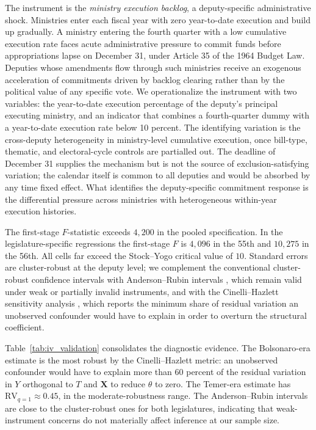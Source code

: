 \documentclass[preprint,12pt,authoryear]{elsarticle}
\begin{document}
The instrument is the \emph{ministry execution backlog}, a deputy-specific administrative shock. Ministries enter each fiscal year with zero year-to-date execution and build up gradually. A ministry entering the fourth quarter with a low cumulative execution rate faces acute administrative pressure to commit funds before appropriations lapse on December 31, under Article 35 of the 1964 Budget Law. Deputies whose amendments flow through such ministries receive an exogenous acceleration of commitments driven by backlog clearing rather than by the political value of any specific vote. We operationalize the instrument with two variables: the year-to-date execution percentage of the deputy's principal executing ministry, and an indicator that combines a fourth-quarter dummy with a year-to-date execution rate below 10 percent. The identifying variation is the cross-deputy heterogeneity in ministry-level cumulative execution, once bill-type, thematic, and electoral-cycle controls are partialled out. The deadline of December 31 supplies the mechanism but is not the source of exclusion-satisfying variation; the calendar itself is common to all deputies and would be absorbed by any time fixed effect. What identifies the deputy-specific commitment response is the differential pressure across ministries with heterogeneous within-year execution histories.

The first-stage $F$-statistic exceeds $4{,}200$ in the pooled specification. In the legislature-specific regressions the first-stage $F$ is $4{,}096$ in the 55th and $10{,}275$ in the 56th. All cells far exceed the Stock--Yogo critical value of $10$. Standard errors are cluster-robust at the deputy level; we complement the conventional cluster-robust confidence intervals with Anderson--Rubin intervals \citep{AndersonRubin1949}, which remain valid under weak or partially invalid instruments, and with the Cinelli--Hazlett sensitivity analysis \citep{CinelliHazlett2020}, which reports the minimum share of residual variation an unobserved confounder would have to explain in order to overturn the structural coefficient.

Table~\ref{tab:iv_validation} consolidates the diagnostic evidence. The Bolsonaro-era estimate is the most robust by the Cinelli--Hazlett metric: an unobserved confounder would have to explain more than $60$ percent of the residual variation in $Y$ orthogonal to $T$ and $\mathbf{X}$ to reduce $\hat\theta$ to zero. The Temer-era estimate has $\mathrm{RV}_{q=1} \approx 0.45$, in the moderate-robustness range. The Anderson--Rubin intervals are close to the cluster-robust ones for both legislatures, indicating that weak-instrument concerns do not materially affect inference at our sample size.
\end{document}
